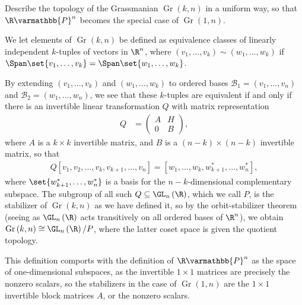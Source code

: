 \documentclass[10pt]{mypackage}
\renewcommand*{\mathbb}[1]{\varmathbb{#1}}
\begin{document}
\RaggedRight
\begin{problem}[Problem 1]
  Describe the topology of the Grassmanian $\operatorname{Gr}\left( k,n \right)$ in a uniform way, so that $\R\mathbb{P}^n$ becomes the special case of $\operatorname{Gr}\left( 1,n \right)$.
\end{problem}
\begin{solution}
We let elements of $\operatorname{Gr}\left( k,n \right)$ be defined as equivalence classes of linearly independent $k$-tuples of vectors in $\R^n$, where $\left( v_1,\dots,v_k \right) \sim \left( w_1,\dots,w_k \right)$ if $\Span \set{v_1,\dots,v_k} = \Span\set{w_1,\dots,w_k} $.\newline

By extending $\left( v_1,\dots,v_k \right)$ and $\left( w_1,\dots,w_k \right)$ to ordered bases $\mathcal{B}_1 = \left( v_1,\dots,v_n \right)$ and $\mathcal{B}_2 = \left( w_1,\dots,w_n \right)$, we see that these $k$-tuples are equivalent if and only if there is an invertible linear transformation $Q$ with matrix representation
\begin{align*}
  Q &= \begin{pmatrix}A & H \\ 0 & B\end{pmatrix},
\end{align*}
where $A$ is a $k\times k$ invertible matrix, and $B$ is a $\left( n-k \right)\times \left( n-k \right)$ invertible matrix, so that 
\begin{align*}
    Q \left[ v_1,v_2,\dots,v_k,v_{k+1},\dots,v_n \right] = \left[ w_1,\dots,w_k,w^{\ast}_{k+1},\dots,w_n^{\ast} \right],
\end{align*}
where $\set{w_{k+1}^{\ast},\dots,w_n^{\ast}}$ is a basis for the $n-k$-dimensional complementary subspace. The subgroup of all such $Q\subseteq \GL_n\left( \R \right)$, which we call $P$, is the stabilizer of $\operatorname{Gr}\left( k,n \right)$ as we have defined it, so by the orbit-stabilizer theorem (seeing as $\GL_n\left( \R \right)$ acts transitively on all ordered bases of $\R^n$), we obtain $\operatorname{Gr}\left( k,n \right)\cong \GL_n\left( \R \right)/P$, where the latter coset space is given the quotient topology.\newline

This definition comports with the definition of $\R\mathbb{P}^{n}$ as the space of one-dimensional subspaces, as the invertible $1\times 1$ matrices are precisely the nonzero scalars, so the stabilizers in the case of $\operatorname{Gr}\left( 1,n \right)$ are the $1\times 1$ invertible block matrices $A$, or the nonzero scalars.
\end{solution}
\end{document}

